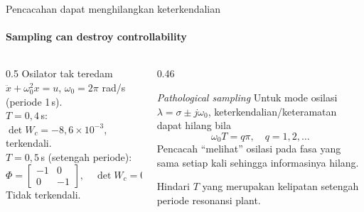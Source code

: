 \documentclass[aspectratio=169,10pt]{beamer}
\begin{document}
\begin{frame}{Pencacahan dapat menghilangkan keterkendalian}
	\framesubtitle{Sampling can destroy controllability}
	\begin{columns}[T]
		\begin{column}{0.5\textwidth}
			\small
			Osilator tak teredam $\ddot x + \omega_0^2x = u$, $\omega_0 = 2\pi$ rad/s (periode 1\,s).\\[4pt]
			$T = 0{,}4$\,s: $\det W_c = -8{,}6\times10^{-3}$, terkendali.\\[4pt]
			$T = 0{,}5$\,s (setengah periode):
			\[
				\Phi = \begin{bmatrix} -1 & 0\\ 0 & -1\end{bmatrix},\quad \det W_c = 0
			\]
			\alert{Tidak terkendali}.
		\end{column}
		\begin{column}{0.46\textwidth}
			\begin{alertblock}{\textit{Pathological sampling}}
				\small
				Untuk mode osilasi $\lambda = \sigma \pm j\omega_0$, keterkendalian/keteramatan dapat hilang bila
				\[
					\omega_0T = q\pi,\quad q = 1, 2, \dots
				\]
				Pencacah ``melihat'' osilasi pada fasa yang sama setiap kali sehingga informasinya hilang.
			\end{alertblock}
			{\small Hindari $T$ yang merupakan kelipatan setengah periode resonansi plant.}
		\end{column}
	\end{columns}
\end{frame}
\end{document}

